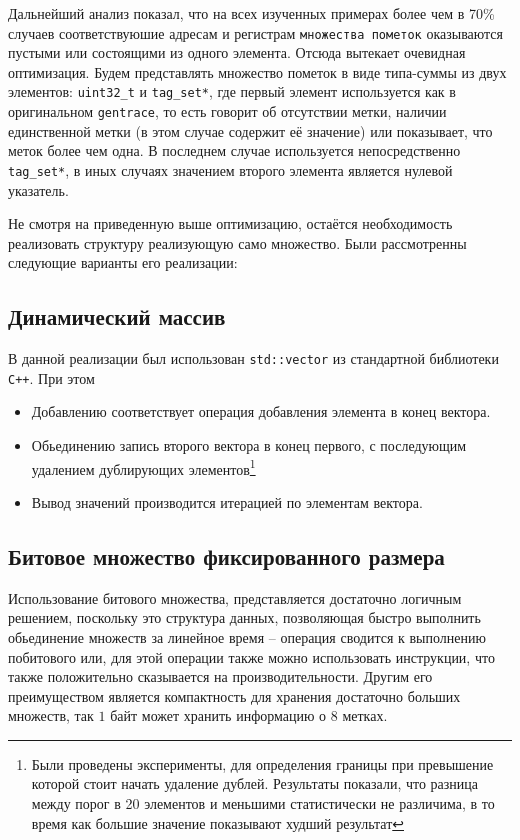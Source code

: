 Дальнейший анализ показал, что на всех изученных примерах более чем в 70\% случаев соответствуюшие адресам и регистрам \texttt{множества пометок} оказываются пустыми или состоящими из одного элемента. Отсюда вытекает очевидная оптимизация. Будем представлять множество пометок в виде типа-суммы из двух элементов: \texttt{uint32\_t} и \texttt{tag\_set*}, где первый элемент используется как в оригинальном \texttt{gentrace}, то есть говорит об отсутствии метки, наличии единственной метки (в этом случае содержит её значение) или показывает, что меток более чем одна. В последнем случае используется непосредственно \texttt{tag\_set*}, в иных случаях значением второго элемента является нулевой указатель.

Не смотря на приведенную выше оптимизацию, остаётся необходимость реализовать структуру реализующую само множество. Были рассмотренны следующие варианты его реализации:


\subsection{Динамический массив}

В данной реализации был использован \texttt{std::vector} из стандартной библиотеки \texttt{C++}. При этом 
\begin{itemize}
    \item Добавлению соответствует операция добавления элемента в конец вектора.
    \item Обьединению запись второго вектора в конец первого, с последующим удалением дублирующих элементов\footnote{Были проведены эксперименты, для определения границы при превышение которой стоит начать удаление дублей. Результаты показали, что разница между порог в 20 элементов и меньшими статистически не различима, в то время как большие значение показывают худший результат}
    \item Вывод значений производится итерацией по элементам вектора.
\end{itemize}

\subsection{Битовое множество фиксированного размера}

Использование битового множества, представляется достаточно логичным решением, поскольку это структура данных, позволяющая быстро выполнить обьединение множеств за линейное время -- операция сводится к выполнению побитового или, для этой операции также можно использовать  инструкции, что также положительно сказывается на производительности. Другим его преимуществом является компактность для хранения достаточно больших множеств, так $1$ байт может хранить информацию о $8$ метках.

